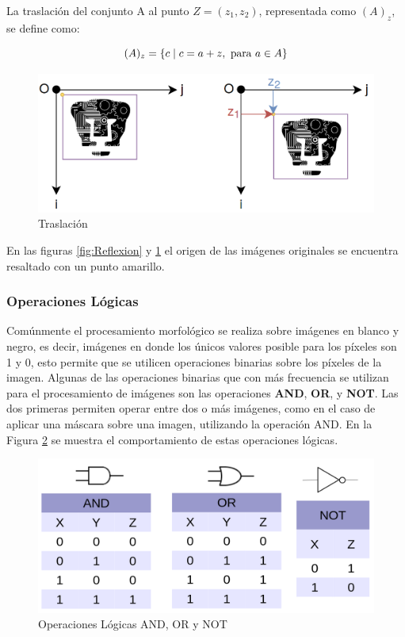 La traslación del conjunto A al punto $Z = (z_{1}, z_{2})$, representada como $(A)_{z}$, se define como:

\begin{equation*}
(A)_{z} = \{ c \mid c = a+z, \textup{ para } a \in A \}
\end{equation*}

\begin{figure}[H]
\centering
\includegraphics[scale=0.32]{Figures/Traslacion.png}
    \caption{Traslación}
    \label{fig:Traslacion}
\end{figure}

En las figuras \ref{fig:Reflexion} y \ref{fig:Traslacion} el origen de las imágenes originales se encuentra resaltado con un punto amarillo.

\subsubsection{Operaciones Lógicas}

Comúnmente el procesamiento morfológico se realiza sobre imágenes en blanco y negro, es decir, imágenes en donde los únicos valores posible para los píxeles son 1 y 0, esto permite que se utilicen operaciones binarias sobre los píxeles de la imagen. 
Algunas de las operaciones binarias que con más frecuencia se utilizan para el procesamiento de imágenes son las operaciones \textbf{AND}, \textbf{OR}, y \textbf{NOT}. Las dos primeras permiten operar entre dos o más imágenes, como en el caso de aplicar una máscara sobre una imagen, utilizando la operación AND. En la Figura \ref{fig:LogicOp} se muestra el comportamiento de estas operaciones lógicas.

\begin{figure}[H]
\centering
\includegraphics[scale=0.2]{Figures/CompuertasLogicas.png}
    \caption{Operaciones Lógicas AND, OR y NOT}
    \label{fig:LogicOp}
\end{figure}

